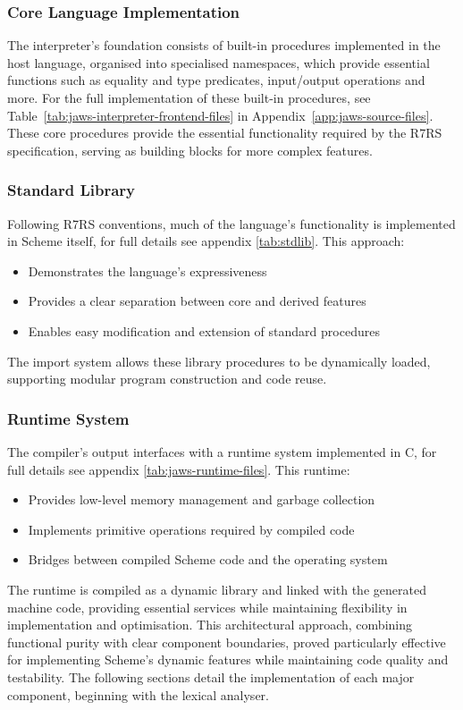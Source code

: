 \documentclass[final]{cmpreport_02}
\begin{document}
\subsubsection{Core Language Implementation}
The interpreter's foundation consists of built-in procedures implemented in the host language, organised into specialised namespaces, which provide essential functions such as equality and type predicates, input/output operations and more. For the full implementation of these built-in procedures, see Table~\ref{tab:jaws-interpreter-frontend-files} in Appendix~\ref{app:jaws-source-files}.
These core procedures provide the essential functionality required by the R7RS specification, serving as building blocks for more complex features.

\subsubsection{Standard Library}
Following R7RS conventions, much of the language's functionality is implemented in Scheme itself, for full details see appendix \ref{tab:stdlib}.  This approach:
\begin{itemize}[noitemsep]
\item Demonstrates the language's expressiveness
\item Provides a clear separation between core and derived features
\item Enables easy modification and extension of standard procedures
\end{itemize}
The import system allows these library procedures to be dynamically loaded, supporting modular program construction and code reuse.
\subsubsection{Runtime System}
The compiler's output interfaces with a runtime system implemented in C, for full details see appendix \ref{tab:jaws-runtime-files}. This runtime:
\begin{itemize}[noitemsep]
\item Provides low-level memory management and garbage collection
\item Implements primitive operations required by compiled code
\item Bridges between compiled Scheme code and the operating system
\end{itemize}
The runtime is compiled as a dynamic library and linked with the generated machine code, providing essential services while maintaining flexibility in implementation and optimisation.
This architectural approach, combining functional purity with clear component boundaries, proved particularly effective for implementing Scheme's dynamic features while maintaining code quality and testability. The following sections detail the implementation of each major component, beginning with the lexical analyser.
\end{document}
